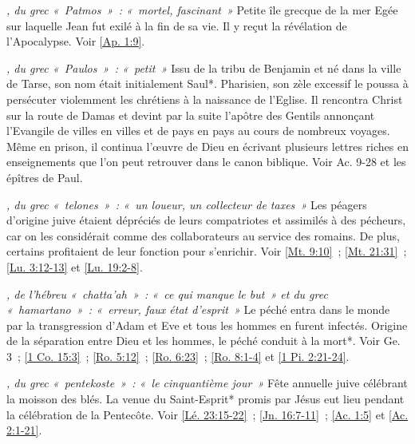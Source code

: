 \begin{multicols}{2}
\textit{, du grec «~Patmos~»~: «~mortel, fascinant~»}\newline
Petite île grecque de la mer Egée sur laquelle Jean fut exilé à la fin de sa vie. Il y reçut la révélation de l'Apocalypse.\newline
Voir \vref{Ap. 1:9}.

\textit{, du grec «~Paulos~»~: «~petit~»}\newline
Issu de la tribu de Benjamin et né dans la ville de Tarse, son nom était initialement Saul*. Pharisien, son zèle excessif le poussa à persécuter violemment les chrétiens à la naissance de l'Eglise. Il rencontra Christ sur la route de Damas et devint par la suite l'apôtre des Gentils annonçant l'Evangile de villes en villes et de pays en pays au cours de nombreux voyages. Même en prison, il continua l'œuvre de Dieu en écrivant plusieurs lettres riches en enseignements que l'on peut retrouver dans le canon biblique.\newline
Voir Ac. 9-28 et les épîtres de Paul.

\textit{, du grec «~telones~»~: «~un loueur, un collecteur de taxes~»}\newline
Les péagers d'origine juive étaient dépréciés de leurs compatriotes et assimilés à des pécheurs, car on les considérait comme des collaborateurs au service des romains. De plus, certains profitaient de leur fonction pour s'enrichir.\newline
Voir \vref{Mt. 9:10}~; \vref{Mt. 21:31}~; \vref{Lu. 3:12-13} et \vref{Lu. 19:2-8}.

\textit{, de l'hébreu «~chatta'ah~»~: «~ce qui manque le but~» et du grec «~hamartano~»~: «~erreur, faux état d'esprit~»}\newline
Le péché entra dans le monde par la transgression d'Adam et Eve et tous les hommes en furent infectés. Origine de la séparation entre Dieu et les hommes, le péché conduit à la mort*.\newline
Voir Ge. 3~; \vref{1 Co. 15:3}~; \vref{Ro. 5:12}~; \vref{Ro. 6:23}~; \vref{Ro. 8:1-4} et \vref{1 Pi. 2:21-24}.

\textit{, du grec «~pentekoste~»~: «~le cinquantième jour~»}\newline
Fête annuelle juive célébrant la moisson des blés. La venue du Saint-Esprit* promis par Jésus eut lieu pendant la célébration de la Pentecôte.\newline
Voir \vref{Lé. 23:15-22}~; \vref{Jn. 16:7-11}~; \vref{Ac. 1:5} et \vref{Ac. 2:1-21}.


\end{multicols}
